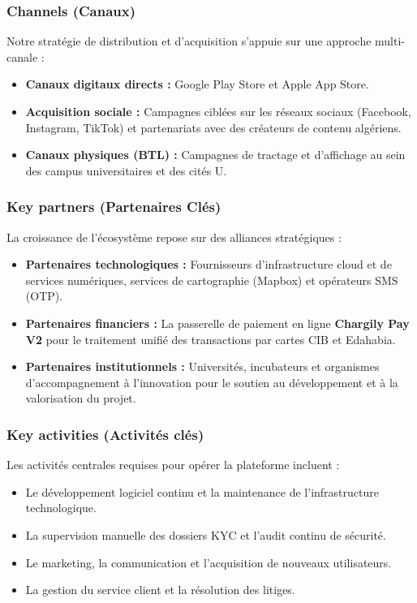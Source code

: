 \subsubsection{Channels (Canaux)}

Notre stratégie de distribution et d'acquisition s'appuie sur une approche multi-canale :
\begin{itemize}
    \item \textbf{Canaux digitaux directs :} Google Play Store et Apple App Store.
    \item \textbf{Acquisition sociale :} Campagnes ciblées sur les réseaux sociaux (Facebook, Instagram, TikTok) et partenariats avec des créateurs de contenu algériens.
    \item \textbf{Canaux physiques (BTL) :} Campagnes de tractage et d'affichage au sein des campus universitaires et des cités U.
\end{itemize}

\subsubsection{Key partners (Partenaires Clés)}

La croissance de l'écosystème repose sur des alliances stratégiques :
\begin{itemize}
    \item \textbf{Partenaires technologiques :} Fournisseurs d'infrastructure cloud et de services numériques, services de cartographie (Mapbox) et opérateurs SMS (OTP).
    \item \textbf{Partenaires financiers :} La passerelle de paiement en ligne \textbf{Chargily Pay V2} pour le traitement unifié des transactions par cartes CIB et Edahabia.
    \item \textbf{Partenaires institutionnels :} Universités, incubateurs et organismes d'accompagnement à l'innovation pour le soutien au développement et à la valorisation du projet.
\end{itemize}

\subsubsection{Key activities (Activités clés)}

Les activités centrales requises pour opérer la plateforme incluent :
\begin{itemize}
    \item Le développement logiciel continu et la maintenance de l'infrastructure technologique.
    \item La supervision manuelle des dossiers KYC et l'audit continu de sécurité.
    \item Le marketing, la communication et l'acquisition de nouveaux utilisateurs.
    \item La gestion du service client et la résolution des litiges.
\end{itemize}

